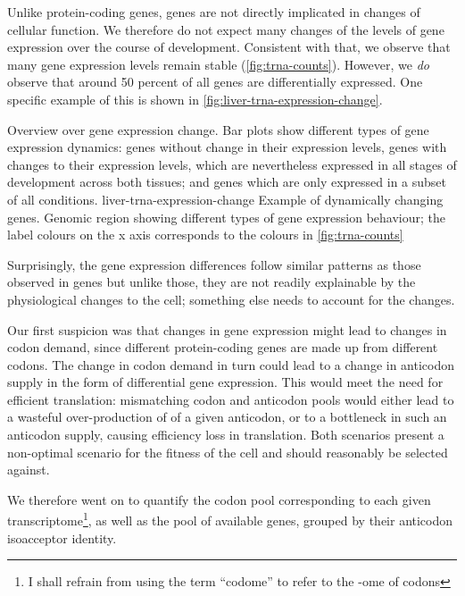 Unlike protein-coding genes, \trna genes are not directly implicated in changes
of cellular function. We therefore do not expect many changes of the levels of
\trna gene expression over the course of development. Consistent with that, we
observe that many \trna gene expression levels remain stable
(\cref{fig:trna-counts}). However, we \emph{do} observe that around \num{50}
percent of all \trna genes are differentially expressed. One specific example of
this is shown in \cref{fig:liver-trna-expression-change}.

    {Overview over \trna gene expression change.}
    {Bar plots show different types of \trna gene expression dynamics: \trna
    genes without change in their expression levels, \trna genes with changes to
    their expression levels, which are nevertheless expressed in all stages of
    development across both tissues; and \trna genes which are only expressed in
    a subset of all conditions.}
    {liver-trna-expression-change}
    {Example of dynamically changing \trna genes.}
    {Genomic region showing different types of \trna gene expression behaviour;
    the label colours on the x axis corresponds to the colours in
    \cref{fig:trna-counts}}

Surprisingly, the \trna gene expression differences follow similar patterns as
those observed in \mrna genes  but unlike those, they are not
readily explainable by the physiological changes to the cell; something else
needs to account for the changes.

Our first suspicion was that changes in \mrna gene expression might lead to
changes in codon demand, since different protein-coding genes are made up from
different codons. The change in codon demand in turn could lead to a change in
anticodon supply in the form of differential \trna gene expression. This would
meet the need for efficient translation: mismatching codon and anticodon pools
would either lead to a wasteful over-production of \trna[s] of a given
anticodon, or to a bottleneck in such an anticodon supply, causing efficiency
loss in translation. Both scenarios present a non-optimal scenario for the
fitness of the cell and should reasonably be selected against.

We therefore went on to quantify the codon pool corresponding to each given
transcriptome\footnote{I shall refrain from using the term “codome” to refer to
the -ome of codons}, as well as the pool of available \trna genes, grouped by
their anticodon isoacceptor identity.


